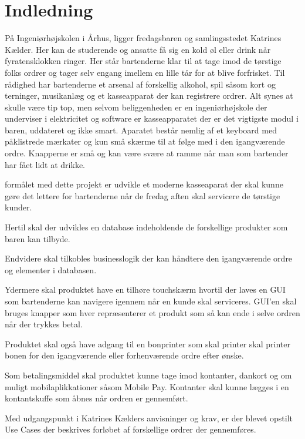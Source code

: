 \chapter{Indledning}

På Ingeniørhøjskolen i Århus, ligger fredagsbaren og samlingsstedet Katrines Kælder.
Her kan de studerende og ansatte få sig en kold øl eller drink når fyratensklokken ringer.
Her står bartenderne klar til at tage imod de tørstige folks ordrer og tager selv engang imellem
en lille tår for at blive forfrisket. 
\newline
Til rådighed har bartenderne et arsenal af forskellig alkohol, spil såsom kort og terninger, musikanlæg
og et kasseapparat der kan registrere ordrer. Alt synes at skulle være tip top, men selvom beliggenheden
er en ingeniørhøjskole der underviser i elektricitet og software er kasseapparatet der er det vigtigste 
modul i baren, uddateret og ikke smart. Aparatet består nemlig af et keyboard med påklistrede mærkater og 
kun små skærme til at følge med i den igangværende ordre. Knapperne er små og kan være svære at ramme når man 
som bartender har fået lidt at drikke. 

formålet med dette projekt er udvikle et moderne kasseaparat der skal kunne gøre det lettere for bartenderne når 
de fredag aften skal 
servicere de tørstige kunder. 
\newline

Hertil skal der udvikles en database indeholdende de forskellige produkter som baren kan tilbyde.
\newline


Endvidere skal tilkobles businesslogik der kan håndtere den igangværende ordre og elementer i databasen. 
\newline


Ydermere skal produktet have en tilhøre touchskærm hvortil der laves en GUI som bartenderne kan navigere igennem 
når en kunde skal serviceres. GUI'en skal bruges knapper som hver repræsenterer et produkt som så kan ende i selve 
ordren når der trykkes betal.
\newline 


Produktet skal også have adgang til en bonprinter som skal printer skal printer bonen for den igangværende eller forhenværende 
ordre efter ønske. 
\newline


Som betalingsmiddel skal produktet kunne tage imod kontanter, dankort og om muligt mobilaplikkationer såsom Mobile Pay. 
Kontanter skal kunne lægges i en kontantskuffe som åbnes når ordren er gennemført. 
\newline

Med udgangspunkt i Katrines Kælders anvisninger og krav, er der blevet opstilt Use Cases der beskrives forløbet af forskellige
ordrer der gennemføres. 











   